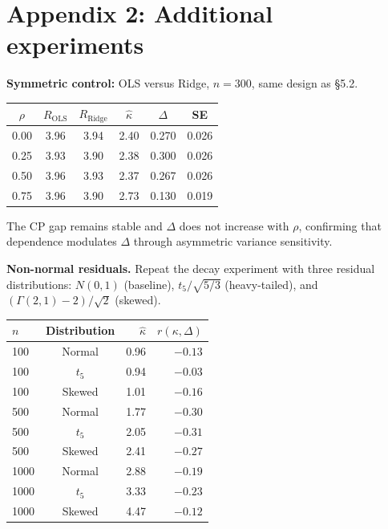 \documentclass[lineno]{biometrika}
\begin{document}
\setlength{\floatsep}{4pt plus 2pt minus 2pt}
\setlength{\textfloatsep}{4pt plus 2pt minus 2pt}

\appendixtwo
\section*{Appendix 2: Additional experiments}

\textbf{Symmetric control:} OLS versus Ridge, $n=300$, same design as \S5.2.

\begin{table}[ht]
{\begin{tabular}{cccccc}
$\rho$ & $R_{\text{OLS}}$ & $R_{\text{Ridge}}$ & $\hat\kappa$ & $\Delta$ & SE \\ \hline
0.00 & 3.96 & 3.94 & 2.40 & 0.270 & 0.026 \\
0.25 & 3.93 & 3.90 & 2.38 & 0.300 & 0.026 \\
0.50 & 3.96 & 3.93 & 2.37 & 0.267 & 0.026 \\
0.75 & 3.96 & 3.90 & 2.73 & 0.130 & 0.019
\end{tabular}}
\end{table}

The CP gap remains stable and $\Delta$ does not increase with $\rho$, confirming that dependence modulates $\Delta$ through asymmetric variance sensitivity.

\textbf{Non-normal residuals.} Repeat the decay experiment with three residual distributions: $N(0,1)$ (baseline), $t_5/\sqrt{5/3}$ (heavy-tailed), and $(\Gamma(2,1)-2)/\sqrt{2}$ (skewed).

\begin{table}[ht]
{\begin{tabular}{lcrr}
$n$ & Distribution & $\hat\kappa$ & $r(\kappa,\Delta)$ \\ \hline
100 & Normal & 0.96 & $-0.13$ \\
100 & $t_5$ & 0.94 & $-0.03$ \\
100 & Skewed & 1.01 & $-0.16$ \\
500 & Normal & 1.77 & $-0.30$ \\
500 & $t_5$ & 2.05 & $-0.31$ \\
500 & Skewed & 2.41 & $-0.27$ \\
1000 & Normal & 2.88 & $-0.19$ \\
1000 & $t_5$ & 3.33 & $-0.23$ \\
1000 & Skewed & 4.47 & $-0.12$
\end{tabular}}
\end{table}
\end{document}
